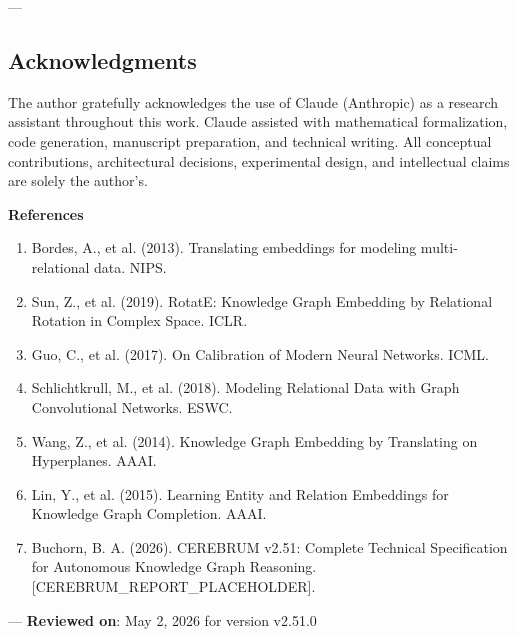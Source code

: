 ---
\subsection{Acknow\-ledgments}

The author gratefully ackno\-wledges the use of Claude (Anthropic) as a research assistant throughout this work. Claude assisted with mathe\-matical forma\-lization, code generation, manuscript preparation, and technical writing. All conceptual contr\-ibutions, archi\-tectural decisions, exper\-imental design, and intel\-lectual claims are solely the author's.

\textbf{References}
\begin{enumerate}
\item Bordes, A., et al. (2013). Translating embeddings for modeling multi-relational data. NIPS.
\item Sun, Z., et al. (2019). RotatE: Knowledge Graph Embedding by Relational Rotation in Complex Space. ICLR.
\item Guo, C., et al. (2017). On Calibration of Modern Neural Networks. ICML.
\item Schlic\-htkrull, M., et al. (2018). Modeling Relational Data with Graph Convol\-utional Networks. ESWC.
\item Wang, Z., et al. (2014). Knowledge Graph Embedding by Translating on Hyperplanes. AAAI.
\item Lin, Y., et al. (2015). Learning Entity and Relation Embeddings for Knowledge Graph Completion. AAAI.
\item Buchorn, B. A. (2026). CEREBRUM v2.51: Complete Technical Specif\-ication for Autonomous Knowledge Graph Reasoning. [CEREBRUM\_REPORT\_PLACEHOLDER].

\end{enumerate}
---
\textbf{Reviewed on}: May 2, 2026 for version v2.51.0
